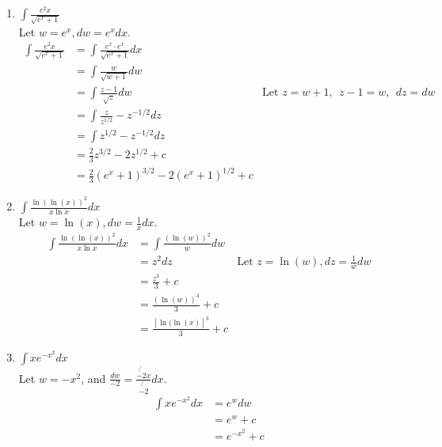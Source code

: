\documentclass{article}
\begin{document}
\begin{enumerate}
    \item $\int \frac{e^2x}{\sqrt{e^x +1}}$\\
    Let $w = e^x, dw = e^x dx$.
    \begin{align*}
        \int \frac{e^2x}{\sqrt{e^x +1}} & = \int \frac{e^x \cdot e^x}{\sqrt{e^x + 1}} dx\\
        & = \int \frac{w}{\sqrt{w + 1}} dw\\
        & = \int \frac{z-1}{\sqrt{z}} dw & \text{Let }z = w+1, \ \ z - 1 = w, \ \ dz = dw\\
        & = \int \frac{z}{z^{1/2}} - z^{-1/2} dz\\
        & = \int z^{1/2} - z^{-1/2} dz\\
        & = \frac{2}{3}z^{3/2} - 2z^{1/2} + c\\
        & = \frac{2}{3}(e^x+1)^{3/2} - 2(e^x + 1)^{1/2} + c
    \end{align*}
    
    \item $\int \frac{\ln(\ln(x))^2}{x \ln x} dx$\\
    Let $w = \ln(x), dw = \frac{1}{x} dx$.
    \begin{align*}
        \int \frac{\ln(\ln(x))^2}{x \ln x} dx & = \int \frac{(\ln(w))^2}{w} dw\\
        & = z^2dz & \text{Let }z = \ln(w), dz = \frac{1}{w} dw\\
        & = \frac{z^3}{3} + c\\
        & = \frac{(\ln(w))^3}{3} + c\\
        & = \frac{[\ln(\ln(x)]^3}{3} + c
    \end{align*}
    
    \item $\int x e^{-x^2} dx$\\
    Let $w = -x^2$, and $\frac{dw}{-2} = \frac{\not{-2}x}{\not{-2}} dx$.
    \begin{align*}
        \int x e^{-x^2} dx & = e^w dw\\
        & = e^w + c\\
        & = e^{-x^2} + c
    \end{align*}
    

\end{enumerate}
\end{document}
